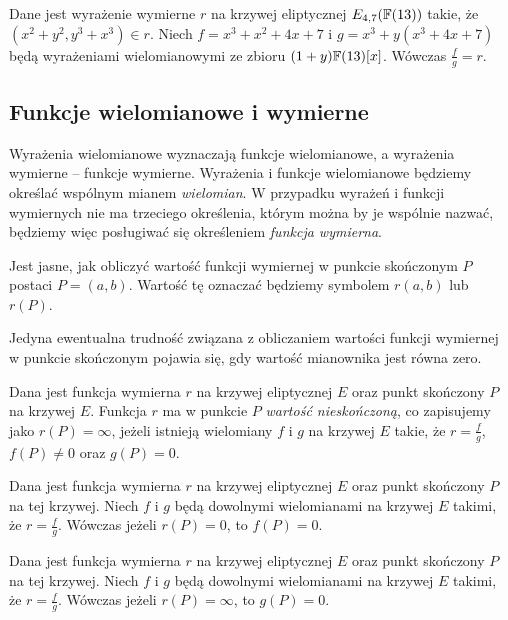 \begin{example}
Dane jest wyrażenie wymierne $r$
na krzywej eliptycznej $E_{4,7}(\mathbb{F}(13))$ takie,
że $(x^2 + y^2, y^3 + x^3) \in r$.
Niech $f = x^3 + x^2 + 4x + 7$ i $g = x^3 + y(x^3 + 4x + 7)$
będą wyrażeniami wielomianowymi ze zbioru $(1 + y)\mathbb{F}(13)[x]$.
Wówczas $\frac{f}{g} = r$.
\end{example}

\subsection*{Funkcje wielomianowe i wymierne}

\noindent
Wyrażenia wielomianowe wyznaczają funkcje wielomianowe,
a wyrażenia wymierne -- funkcje wymierne.
Wyrażenia i funkcje wielomianowe będziemy określać
wspólnym mianem \emph{wielomian}.
W przypadku wyrażeń i funkcji wymiernych nie ma trzeciego określenia,
którym można by je wspólnie nazwać,
będziemy więc posługiwać się określeniem \emph{funkcja wymierna}.

\begin{remark}
Jest jasne, jak obliczyć wartość funkcji wymiernej w punkcie skończonym $P$
postaci $P = (a, b)$.
Wartość tę oznaczać będziemy symbolem $r(a, b)$ lub $r(P)$.
\end{remark}

\noindent
Jedyna ewentualna trudność
związana z obliczaniem wartości funkcji wymiernej
w punkcie skończonym pojawia się,
gdy wartość mianownika jest równa zero.

\begin{definition}
Dana jest funkcja wymierna $r$ na krzywej eliptycznej $E$
oraz punkt skończony $P$ na krzywej $E$.
Funkcja $r$ ma w punkcie $P$ \emph{wartość nieskończoną},
co zapisujemy jako $r(P) = \infty$,
jeżeli istnieją wielomiany $f$ i $g$ na krzywej $E$ takie,
że $r = \frac{f}{g}$, $f(P) \neq 0$ oraz $g(P) = 0$.
\end{definition}

\begin{theorem}
Dana jest funkcja wymierna $r$ na krzywej eliptycznej $E$
oraz punkt skończony $P$ na tej krzywej.
Niech $f$ i $g$ będą dowolnymi wielomianami na krzywej $E$ takimi,
że $r = \frac{f}{g}$.
Wówczas jeżeli $r(P) = 0$, to $f(P) = 0$.
\end{theorem}

\begin{theorem}
Dana jest funkcja wymierna $r$ na krzywej eliptycznej $E$
oraz punkt skończony $P$ na tej krzywej.
Niech $f$ i $g$ będą dowolnymi wielomianami na krzywej $E$ takimi,
że $r = \frac{f}{g}$.
Wówczas jeżeli $r(P) = \infty$, to $g(P) = 0$.
\end{theorem}

